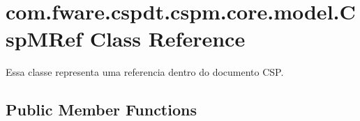 \hypertarget{classcom_1_1fware_1_1cspdt_1_1cspm_1_1core_1_1model_1_1_csp_m_ref}{}\section{com.\+fware.\+cspdt.\+cspm.\+core.\+model.\+Csp\+M\+Ref Class Reference}
\label{classcom_1_1fware_1_1cspdt_1_1cspm_1_1core_1_1model_1_1_csp_m_ref}


Essa classe representa uma referencia dentro do documento C\+SP.  


\subsection*{Public Member Functions}
